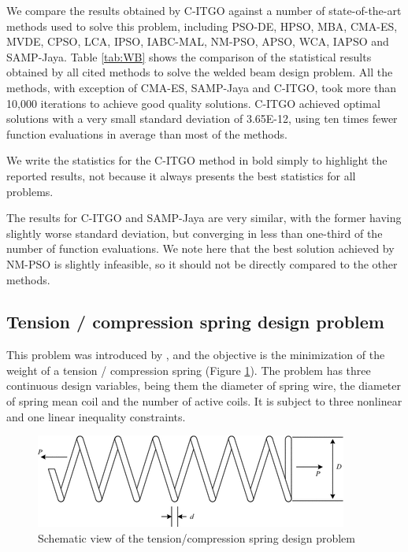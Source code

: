 We compare the results obtained by C-ITGO against a number of state-of-the-art methods used to solve this problem, including PSO-DE, HPSO, MBA, CMA-ES, MVDE, CPSO, LCA, IPSO, IABC-MAL, NM-PSO, APSO, WCA, IAPSO and SAMP-Jaya. Table \ref{tab:WB} shows the comparison of the statistical results obtained by all cited methods to solve the welded beam design problem. All the methods, with exception of CMA-ES, SAMP-Jaya and C-ITGO, took more than 10,000 iterations to achieve good quality solutions. C-ITGO achieved optimal solutions with a very small standard deviation of 3.65E-12, using ten times fewer function evaluations in average than most of the methods.

We write the statistics for the C-ITGO method in bold simply to highlight the reported results, not because it always presents the best statistics for all problems.



The results for C-ITGO and SAMP-Jaya are very similar, with the former having slightly worse standard deviation, but converging in less than one-third of the number of function evaluations. We note here that the best solution achieved by NM-PSO is slightly infeasible, so it should not be directly compared to the other methods.




\subsection{Tension / compression spring design problem}

This problem was introduced by \cite{TC}, and the objective is the minimization of the weight of a tension / compression spring (Figure \ref{fig:TC}). The problem has three continuous design variables, being them the diameter of spring wire, the diameter of spring mean coil and the number of active coils. It is subject to three nonlinear and one linear inequality constraints.

\begin{figure}[h]
\begin{center}
\includegraphics[scale=0.6]{Imgs/TC.png}
\end{center}
\captionsetup{justification=centering}
\caption{Schematic view of the tension/compression spring design problem}\label{fig:TC}
\end{figure}


